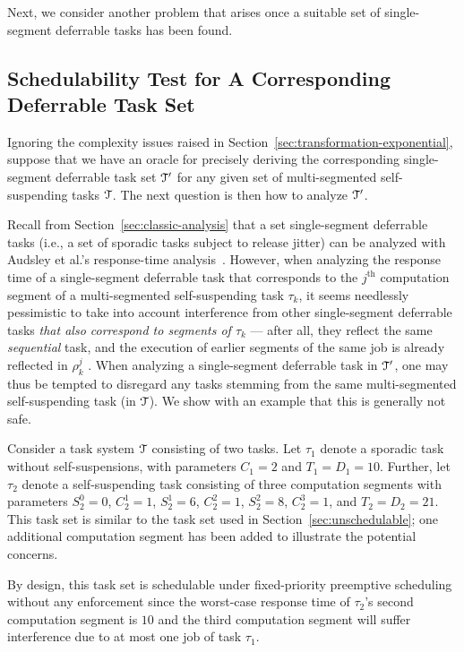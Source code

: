 Next, we consider another problem that arises once a suitable set of single-segment deferrable tasks has been found. 


\subsection{Schedulability Test for A Corresponding Deferrable Task Set}
\label{sec:schedulability-test-deferrable}

Ignoring the complexity issues raised in Section~\ref{sec:transformation-exponential}, suppose that we have an oracle for precisely deriving the corresponding single-segment deferrable task set $\mathcal{T}'$ for any given set of multi-segmented self-suspending tasks $\mathcal{T}$. The next question is then how to analyze $\mathcal{T}'$.

Recall from Section~\ref{sec:classic-analysis} that a set single-segment deferrable tasks (i.e., a set of sporadic tasks subject to release jitter) can be analyzed with Audsley et al.'s response-time analysis~\cite{ABRTW:93}. However, when analyzing the response time of a single-segment deferrable task that corresponds to the  $j^{\mathrm{th}}$ computation segment of a multi-segmented self-suspending task $\tau_k$, it seems needlessly pessimistic to take into account interference from other single-segment deferrable tasks \emph{that also correspond to segments of $\tau_k$} --- after all, they reflect the same \emph{sequential} task, and  the execution of earlier segments of the same job is already reflected in $\rho_k^j$ .
When analyzing a single-segment deferrable task in $\mathcal{T}'$, one may thus be tempted to disregard any tasks stemming from the same multi-segmented self-suspending task (in $\mathcal{T}$). We show with an example that this is generally not safe.


Consider a task system $\mathcal{T}$ consisting of two tasks. Let $\tau_1$ denote a sporadic task without self-suspensions, with parameters $C_1 = 2$ and $T_1=D_1=10$. Further, let $\tau_2$ denote a self-suspending task consisting of three computation segments with parameters $S_2^0 = 0$, $C_2^1 = 1$,  $S_2^1 = 6$, $C_2^2=1$, $S_2^2=8$, $C_2^3=1$, and $ T_2=D_2=21$. 
This task set is similar to the task set used in Section~\ref{sec:unschedulable}; one additional computation segment has been added to illustrate the potential concerns. 

By design, this task set is schedulable under fixed-priority preemptive scheduling without any enforcement since the worst-case response time of $\tau_2$'s second computation segment is $10$ and the third computation segment will suffer interference due to at most one job of task $\tau_1$.


